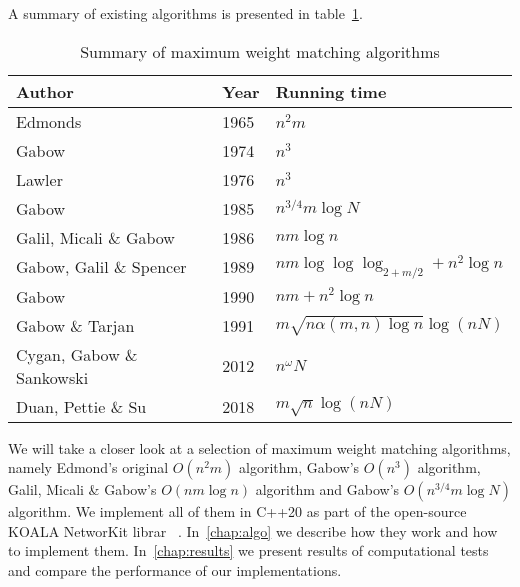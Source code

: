 A summary of existing algorithms is presented in table~\ref{tab:complexity}.

\begin{table}
\centering
\renewcommand{\arraystretch}{1.25}
\setlength{\tabcolsep}{1em}
\begin{tabular}{|l|l|l|}
\hline
Author & Year & Running time \\
\hline
Edmonds & 1965 & $n^2m$ \\
\hline
Gabow & 1974 & $n^3$ \\
\hline
Lawler & 1976 & $n^3$ \\
\hline
Gabow & 1985 & $n^{3/4}m \log N$ \\
\hline
Galil, Micali \& Gabow & 1986 & $nm \log n$ \\
\hline
Gabow, Galil \& Spencer & 1989 & $nm \log \log \log_{2 + m/2} + n^2\log n$ \\
\hline
Gabow & 1990 & $nm + n^2 \log n$ \\
\hline
Gabow \& Tarjan & 1991 & $m \sqrt{n \alpha(m, n) \log n} \log (nN)$ \\
\hline
Cygan, Gabow \& Sankowski & 2012 & $n^\omega N$ \\
\hline
Duan, Pettie \& Su & 2018 & $m \sqrt{n} \log(nN)$ \\
\hline
\end{tabular}
\caption{Summary of maximum weight matching algorithms}\label{tab:complexity}
\end{table}

We will take a closer look at a selection of maximum weight matching algorithms, namely Edmond's original $O(n^2m)$ algorithm, Gabow's $O(n^3)$ algorithm, Galil, Micali \& Gabow's $O(nm \log n)$ algorithm and Gabow's $O(n^{3/4}m \log N)$ algorithm. We implement all of them in C++20 as part of the open-source KOALA NetworKit librar~\cite{koala-networkit} . In~\autoref{chap:algo} we describe how they work and how to implement them. In~\autoref{chap:results} we present results of computational tests and compare the performance of our implementations.
